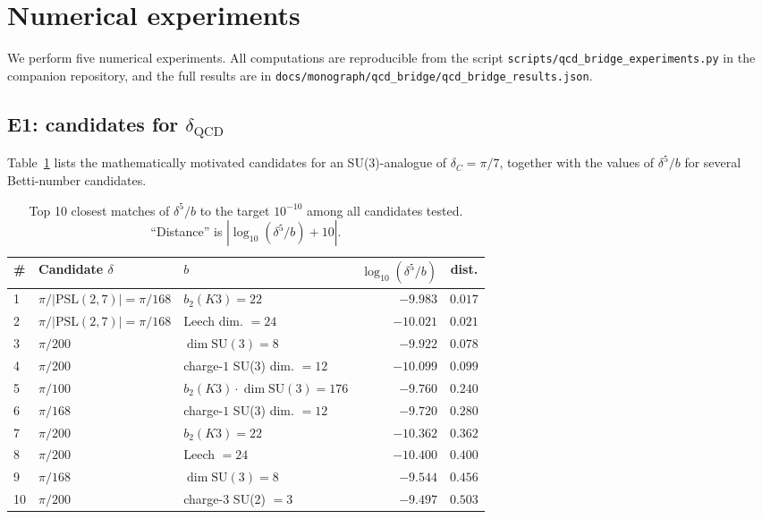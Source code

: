 \documentclass[11pt,a4paper]{article}
\newcommand{\dC}{\delta_C}
\newcommand{\SU}{\mathrm{SU}}
\newcommand{\PSL}{\mathrm{PSL}}
\theoremstyle{plain}
\theoremstyle{definition}
\theoremstyle{remark}
\begin{document}
\section{Numerical experiments}\label{sec:numerics}

We perform five numerical experiments.  All computations are
reproducible from the script
\texttt{scripts/qcd\_bridge\_experiments.py} in the companion
repository, and the full results are in
\texttt{docs/monograph/qcd\_bridge/qcd\_bridge\_results.json}.

\subsection{E1: candidates for $\delta_{\mathrm{QCD}}$}\label{ssec:E1}

Table~\ref{tab:delta-candidates} lists the mathematically motivated
candidates for an SU(3)-analogue of $\dC=\pi/7$, together with the
values of $\delta^5/b$ for several Betti-number candidates.

\begin{table}[htbp]
\centering
\small
\caption{Top 10 closest matches of $\delta^5/b$ to the target $10^{-10}$
among all candidates tested.  ``Distance'' is $|\log_{10}(\delta^5/b)+10|$.}
\label{tab:delta-candidates}
\begin{tabularx}{\textwidth}{@{}lXXrc@{}}
\toprule
\# & Candidate $\delta$ & $b$ & $\log_{10}(\delta^5/b)$ & dist. \\
\midrule
1 & $\pi/|\PSL(2,7)|=\pi/168$ & $b_2(K3)=22$ & $-9.983$ & $\mathbf{0.017}$ \\
2 & $\pi/|\PSL(2,7)|=\pi/168$ & Leech dim. $=24$ & $-10.021$ & $0.021$ \\
3 & $\pi/200$ & $\dim\SU(3)=8$ & $-9.922$ & $0.078$ \\
4 & $\pi/200$ & charge-$1$ SU(3) dim. $=12$ & $-10.099$ & $0.099$ \\
5 & $\pi/100$ & $b_2(K3)\cdot \dim\SU(3) = 176$ & $-9.760$ & $0.240$ \\
6 & $\pi/168$ & charge-$1$ SU(3) dim. $=12$ & $-9.720$ & $0.280$ \\
7 & $\pi/200$ & $b_2(K3)=22$ & $-10.362$ & $0.362$ \\
8 & $\pi/200$ & Leech $=24$ & $-10.400$ & $0.400$ \\
9 & $\pi/168$ & $\dim\SU(3)=8$ & $-9.544$ & $0.456$ \\
10 & $\pi/200$ & charge-$3$ SU(2) $=3$ & $-9.497$ & $0.503$ \\
\bottomrule
\end{tabularx}
\end{table}
\end{document}
